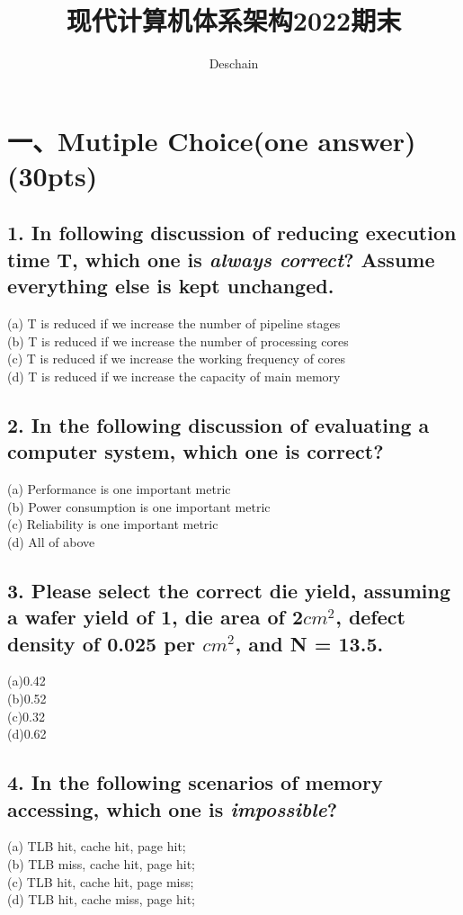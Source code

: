 \documentclass[UTF8]{ctexart}
\title{现代计算机体系架构2022期末}
\author{Deschain}
\begin{document}
\maketitle
\section*{一、Mutiple Choice(one answer)(30pts)}
\subsection*{1. In following discussion of reducing execution time T, which one is \textit{\bfseries always correct}? Assume everything else is kept unchanged.}
(a) T is reduced if we increase the number of pipeline stages\\
(b) T is reduced if we increase the number of processing cores\\
(c) T is reduced if we increase the working frequency of cores\\
(d) T is reduced if we increase the capacity of main memory\\

\subsection*{2. In the following discussion of evaluating a computer system, which one is correct?}
(a) Performance is one important metric\\
(b) Power consumption is one important metric\\
(c) Reliability is one important metric\\
(d) All of above\\

\subsection*{3. Please select the correct die yield, assuming a wafer yield of 1, die area of 2$cm^2$, defect density of 0.025 per $cm^2$, and N = 13.5.}
(a)0.42\\
(b)0.52\\
(c)0.32\\
(d)0.62\\

\subsection*{4. In the following scenarios of memory accessing, which one is {\bfseries\textit {impossible}}?}
(a) TLB hit, cache hit, page hit;\\
(b) TLB miss, cache hit, page hit;\\
(c) TLB hit, cache hit, page miss;\\
(d) TLB hit, cache miss, page hit;\\
\end{document}
